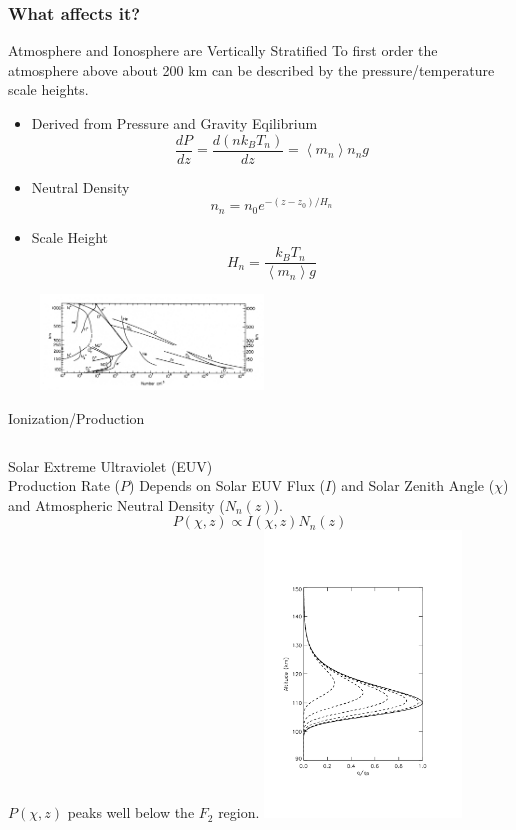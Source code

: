 \documentclass{beamer}
\begin{document}
\subsubsection{What affects it?}
\begin{frame}
  {Atmosphere and Ionosphere are Vertically Stratified}
  To first order the atmosphere above about 200 km can be described by the pressure/temperature scale heights.
  \begin{itemize}
    \item      Derived from Pressure and Gravity Eqilibrium $$\frac{dP}{dz} = \frac{d(nk_BT_n)}{dz} = \left< m_n \right> n_n g$$
    \item      Neutral Density $$ n_n = n_0 e^{-(z-z_0)/H_n} $$
    \item      Scale Height $$ H_n=\frac{k_B T_n}{\left<m_n\right> g} $$
  \end{itemize}
  \includegraphics[height=1in,width=3in]{atmos}
\end{frame}

\begin{frame}
  {Ionization/Production}
  \begin{columns}
   \column{1.5in}
         Solar Extreme Ultraviolet (EUV)\\
          Production Rate ($P$) Depends on Solar EUV Flux ($I$) and Solar Zenith Angle ($\chi$) and Atmospheric Neutral Density ($N_n(z)$).
    $$P(\chi,z)\propto I(\chi,z) N_n(z)$$
    $P(\chi,z)$ peaks well below the $F_2$ region.
   \column{1.5in}
    \includegraphics[height=3in]{production}
  \end{columns}
\end{frame}
\end{document}
